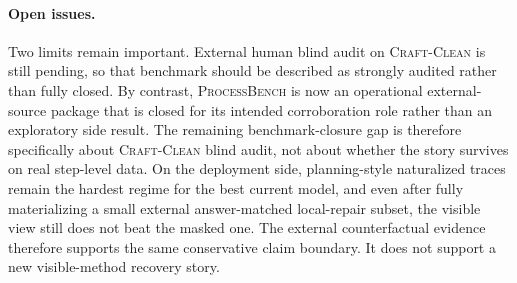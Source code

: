 \paragraph{Open issues.}
Two limits remain important. External human blind audit on \textsc{Craft-Clean}
is still pending, so that benchmark should be described as strongly audited
rather than fully closed. By contrast, \textsc{ProcessBench} is now an
operational external-source package that is closed for its intended
corroboration role rather than an exploratory side result. The remaining
benchmark-closure gap is therefore specifically about \textsc{Craft-Clean}
blind audit, not about whether the story survives on real step-level data. On
the deployment side, planning-style naturalized traces remain the hardest
regime for the best current model, and even after fully materializing a small
external answer-matched local-repair subset, the visible view still does not
beat the masked one. The external counterfactual evidence therefore supports
the same conservative claim boundary. It does not support a new visible-method
recovery story.
